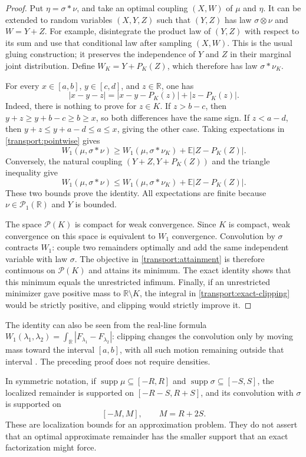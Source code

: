 \documentclass[11pt,letterpaper]{article}
\theoremstyle{definition}
\theoremstyle{remark}
\newcommand{\R}{\mathbb R}
\newcommand{\E}{\mathbb E}
\newcommand{\Pone}{\mathcal P_1(\R)}
\newcommand{\supp}{\operatorname{supp}}
\begin{document}
\begin{proof}
Put $\eta=\sigma*\nu$, and take an optimal coupling $(X,W)$ of
$\mu$ and $\eta$.  It can be extended to random variables $(X,Y,Z)$
such that $(Y,Z)$ has law $\sigma\otimes\nu$ and $W=Y+Z$.
For example, disintegrate the product law of $(Y,Z)$ with respect to its
sum and use that conditional law after sampling $(X,W)$.  This is the
usual gluing construction; it preserves the independence of $Y$ and $Z$
in their marginal joint distribution.  Define
$W_K=Y+P_K(Z)$, which therefore has law $\sigma*\nu_K$.

For every $x\in[a,b]$, $y\in[c,d]$, and $z\in\R$, one has
\begin{equation}\label{transport:pointwise}
 |x-y-z|
 =|x-y-P_K(z)|+|z-P_K(z)|.
\end{equation}
Indeed, there is nothing to prove for $z\in K$.  If $z>b-c$, then
$y+z\ge y+b-c\ge b\ge x$, so both differences have the same sign.
If $z<a-d$, then $y+z\le y+a-d\le a\le x$, giving the other case.
Taking expectations in \eqref{transport:pointwise} gives
\[
 W_1(\mu,\sigma*\nu)
 \ge W_1(\mu,\sigma*\nu_K)
       +\E|Z-P_K(Z)|.
\]
Conversely, the natural coupling $(Y+Z,Y+P_K(Z))$ and the triangle
inequality give
\[
 W_1(\mu,\sigma*\nu)
 \le W_1(\mu,\sigma*\nu_K)+\E|Z-P_K(Z)|.
\]
These two bounds prove the identity.  All expectations are finite because
$\nu\in\Pone$ and $Y$ is bounded.

The space $\mathcal P(K)$ is compact for weak convergence.  Since $K$
is compact, weak convergence on this space is equivalent to $W_1$
convergence.  Convolution by $\sigma$ contracts $W_1$: couple two
remainders optimally and add the same independent variable with law
$\sigma$.  The objective in \eqref{transport:attainment} is therefore
continuous on $\mathcal P(K)$ and attains its minimum.  The exact
identity shows that this minimum equals the unrestricted infimum.
Finally, if an unrestricted minimizer gave positive mass to $\R\setminus
K$, the integral in \eqref{transport:exact-clipping} would be strictly
positive, and clipping would strictly improve it.
\end{proof}

The identity can also be seen from the real-line formula
$W_1(\lambda_1,\lambda_2)=\int_{\R}|F_{\lambda_1}-F_{\lambda_2}|$:
clipping changes the convolution only by moving mass toward the interval
$[a,b]$, with all such motion remaining outside that interval
\cite{Vallender}.  The preceding proof does not require densities.

In symmetric notation, if $\supp\mu\subseteq[-R,R]$ and
$\supp\sigma\subseteq[-S,S]$, the localized remainder is supported on
$[-R-S,R+S]$, and its convolution with $\sigma$ is supported on
\begin{equation}\label{transport:radius}
 [-M,M],\qquad M=R+2S.
\end{equation}
These are localization bounds for an approximation problem.  They do not
assert that an optimal approximate remainder has the smaller support
that an exact factorization might force.
\end{document}
